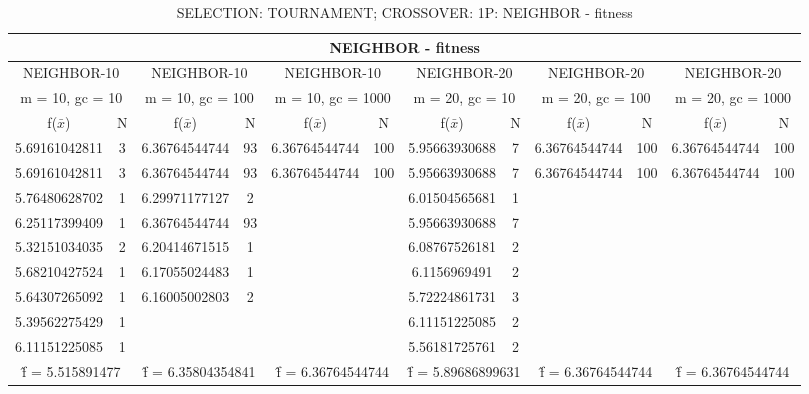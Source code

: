 \begin{table}[H]
	\centering
	\caption{SELECTION: TOURNAMENT; CROSSOVER: 1P: NEIGHBOR - fitness}
	\begin{adjustbox}{width=1\textwidth}
		\begin{tabular}{ |c|c||c|c||c|c||c|c||c|c||c|c| }
			\hline
			\multicolumn{12}{|c|}{NEIGHBOR - fitness} \\
			\hline
			\multicolumn{2}{|c||}{NEIGHBOR-10} & \multicolumn{2}{c||}{NEIGHBOR-10} & \multicolumn{2}{c||}{NEIGHBOR-10} & \multicolumn{2}{c||}{NEIGHBOR-20} & \multicolumn{2}{c||}{NEIGHBOR-20} & \multicolumn{2}{c|}{NEIGHBOR-20}\\
			\hline
			\multicolumn{2}{|c||}{m = 10, gc = 10} & \multicolumn{2}{c||}{m = 10, gc = 100} & \multicolumn{2}{c||}{m = 10, gc = 1000} & \multicolumn{2}{c||}{m = 20, gc = 10} & \multicolumn{2}{c||}{m = 20, gc = 100} & \multicolumn{2}{c|}{m = 20, gc = 1000}\\
			\hline
			f($\bar{x}$) & N & f($\bar{x}$) & N & f($\bar{x}$) & N & f($\bar{x}$) & N & f($\bar{x}$) & N & f($\bar{x}$) & N\\
			\hline
			\hline
			5.69161042811 & 3 & 6.36764544744 & 93 & 6.36764544744 & 100 & 5.95663930688 & 7 & 6.36764544744 & 100 & 6.36764544744 & 100\\
			\hline
			5.69161042811 & 3 & 6.36764544744 & 93 & 6.36764544744 & 100 & 5.95663930688 & 7 & 6.36764544744 & 100 & 6.36764544744 & 100\\
			5.76480628702 & 1 & 6.29971177127 & 2 &   &   & 6.01504565681 & 1 &   &   &   &  \\
			6.25117399409 & 1 & 6.36764544744 & 93 &   &   & 5.95663930688 & 7 &   &   &   &  \\
			5.32151034035 & 2 & 6.20414671515 & 1 &   &   & 6.08767526181 & 2 &   &   &   &  \\
			5.68210427524 & 1 & 6.17055024483 & 1 &   &   & 6.1156969491 & 2 &   &   &   &  \\
			5.64307265092 & 1 & 6.16005002803 & 2 &   &   & 5.72224861731 & 3 &   &   &   &  \\
			5.39562275429 & 1 &   &   &   &   & 6.11151225085 & 2 &   &   &   &  \\
			6.11151225085 & 1 &   &   &   &   & 5.56181725761 & 2 &   &   &   &  \\
			\hline
			\multicolumn{2}{|c||}{\^{f} = 5.515891477} & \multicolumn{2}{c||}{\^{f} = 6.35804354841} & \multicolumn{2}{c||}{\^{f} = 6.36764544744} & \multicolumn{2}{c||}{\^{f} = 5.89686899631} & \multicolumn{2}{c||}{\^{f} = 6.36764544744} & \multicolumn{2}{c|}{\^{f} = 6.36764544744}\\
			\hline
		\end{tabular}
	\end{adjustbox}
\end{table}
